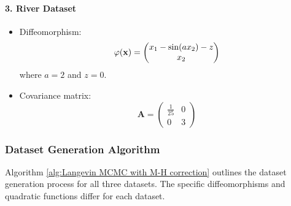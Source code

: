 \paragraph{3. River Dataset}

\begin{itemize}
    \item Diffeomorphism: 
    \[
    \varphi(\mathbf{x}) = \begin{pmatrix} 
    x_1 - \sin(a x_2) - z \\
    x_2 
    \end{pmatrix}
    \]
    where $a = 2$ and $z = 0$.
    \item Covariance matrix:
    \[
    \mathbf{A} = \begin{pmatrix} 
    \frac{1}{25} & 0 \\
    0 & 3 
    \end{pmatrix}
    \]
\end{itemize}

\subsubsection{Dataset Generation Algorithm}

Algorithm \ref{alg:Langevin MCMC with M-H correction} outlines the dataset generation process for all three datasets. The specific diffeomorphisms and quadratic functions differ for each dataset.

